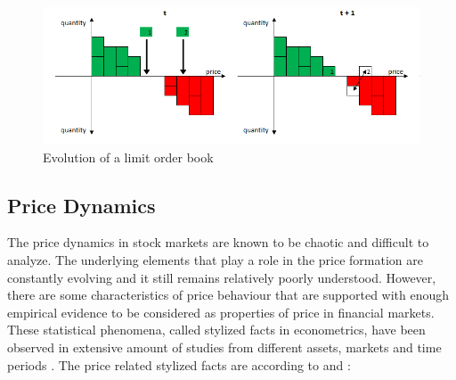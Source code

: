 \begin{figure}
    \begin{center}  
        \includegraphics[width=15cm]{diagrams/lob_evolution.png}
        \caption{Evolution of a limit order book}
        \label{fig:lob_evo}
    \end{center}
\end{figure}

\subsection{Price Dynamics}
The price dynamics in stock markets are known to be chaotic and difficult to 
analyze. The underlying elements that play a role in the price formation
are constantly evolving and it still remains relatively poorly understood.
However, there are some characteristics of price behaviour that are supported
with enough empirical evidence to be considered as properties of price in
financial markets. These statistical phenomena, called stylized facts in
econometrics, have been observed in extensive amount of studies from 
different assets, markets and time periods \citep{Shakeel18}. 
The price related stylized facts are according to \citet{StylizedFacts01} and \citet{lob13}:

